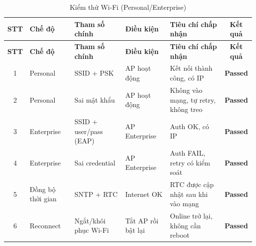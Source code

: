         \begin{longtable}{|c|p{2cm}|p{3.5cm}|p{2.5cm}|p{4cm}|c|}
            \caption{Kiểm thử Wi-Fi (Personal/Enterprise)}
            \label{tab:test_wifi} \\
            \hline
            \textbf{STT} & \textbf{Chế độ} & \textbf{Tham số chính} & \textbf{Điều kiện} & \textbf{Tiêu chí chấp nhận} & \textbf{Kết quả} \\ \hline
            \endfirsthead

            \hline
            \textbf{STT} & \textbf{Chế độ} & \textbf{Tham số chính} & \textbf{Điều kiện} & \textbf{Tiêu chí chấp nhận} & \textbf{Kết quả} \\ \hline
            \endhead

            \hline
            \endfoot
            \endlastfoot

            1 & Personal & SSID + PSK & AP hoạt động & Kết nối thành công, có IP & \textcolor{modern_blue}{\textbf{Passed}} \\ \hline
            2 & Personal & Sai mật khẩu & AP hoạt động & Không vào mạng, tự retry, không treo & \textcolor{modern_blue}{\textbf{Passed}} \\ \hline
            3 & Enterprise & SSID + user/pass (EAP) & AP Enterprise & Auth OK, có IP & \textcolor{modern_blue}{\textbf{Passed}} \\ \hline
            4 & Enterprise & Sai credential & AP Enterprise & Auth FAIL, retry có kiểm soát & \textcolor{modern_blue}{\textbf{Passed}} \\ \hline
            5 & Đồng bộ thời gian & SNTP + RTC & Internet OK & RTC được cập nhật sau khi vào mạng & \textcolor{modern_blue}{\textbf{Passed}} \\ \hline
            6 & Reconnect & Ngắt/khôi phục Wi-Fi & Tắt AP rồi bật lại & Online trở lại, không cần reboot & \textcolor{modern_blue}{\textbf{Passed}} \\ \hline
        \end{longtable}


